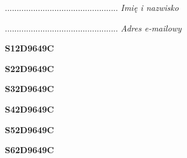 \begin{turn}{90}\begin{minipage}{\linewidth} \vspace{20mm} ................................................  \textit{Imię i nazwisko}\end{minipage}\end{turn}

\begin{turn}{90}\begin{minipage}{\linewidth} \vspace{20mm} ................................................  \textit{Adres e-mailowy}\end{minipage}\end{turn}

\begin{turn}{90}\huge \begin{minipage}{\linewidth} \vspace{10mm}\textbf{S12D9649C}\end{minipage}\end{turn}

\begin{turn}{90}\huge \begin{minipage}{\linewidth} \vspace{10mm}\textbf{S22D9649C}\end{minipage}\end{turn}

\begin{turn}{90}\huge \begin{minipage}{\linewidth} \vspace{10mm}\textbf{S32D9649C}\end{minipage}\end{turn}

\begin{turn}{90}\huge \begin{minipage}{\linewidth} \vspace{10mm}\textbf{S42D9649C}\end{minipage}\end{turn}

\begin{turn}{90}\huge \begin{minipage}{\linewidth} \vspace{10mm}\textbf{S52D9649C}\end{minipage}\end{turn}

\begin{turn}{90}\huge \begin{minipage}{\linewidth} \vspace{10mm}\textbf{S62D9649C}\end{minipage}\end{turn}

